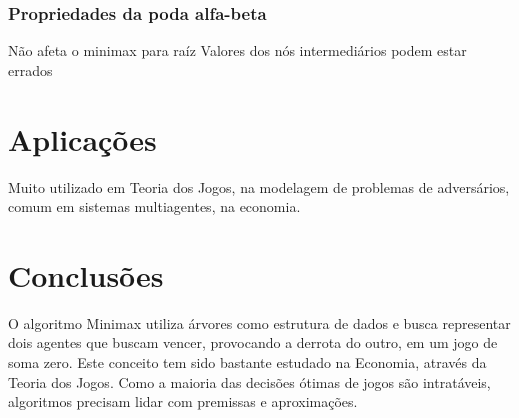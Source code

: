 \documentclass[sigplan,screen]{acmart}
\begin{document}
\subsubsection{Propriedades da poda alfa-beta}
Não afeta o minimax para raíz
Valores dos nós intermediários podem estar errados

\section{Aplicações}
Muito utilizado em Teoria dos Jogos, na modelagem de problemas de adversários, comum em sistemas multiagentes, na economia.

\section{Conclusões}
O algoritmo Minimax utiliza árvores como estrutura de dados e busca representar dois agentes que buscam vencer, provocando a derrota do outro, em um jogo de soma zero. 
Este conceito tem sido bastante estudado na Economia, através da Teoria dos Jogos. Como a maioria das decisões ótimas de jogos são intratáveis, algoritmos precisam lidar com premissas e aproximações.



\end{document}
